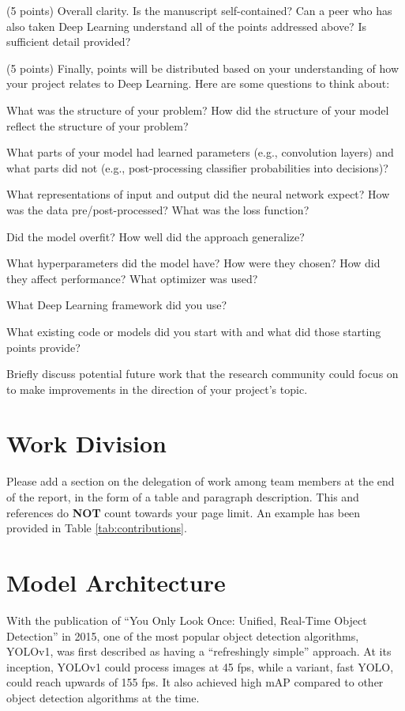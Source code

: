\documentclass[10pt,twocolumn,letterpaper]{article}
\begin{document}
(5 points) Overall clarity. Is the manuscript self-contained? Can a peer who has also taken Deep Learning understand all of the points addressed above? Is sufficient detail provided? 

(5 points) Finally, points will be distributed based on your understanding of how your project relates to Deep Learning. Here are some questions to think about: 

What was the structure of your problem? How did the structure of your model reflect the structure of your problem? 

What parts of your model had learned parameters (e.g., convolution layers) and what parts did not (e.g., post-processing classifier probabilities into decisions)? 

What representations of input and output did the neural network expect? How was the data pre/post-processed?
What was the loss function? 

Did the model overfit? How well did the approach generalize? 

What hyperparameters did the model have? How were they chosen? How did they affect performance? What optimizer was used? 

What Deep Learning framework did you use? 

What existing code or models did you start with and what did those starting points provide? 

Briefly discuss potential future work that the research community could focus on to make improvements in the direction of your project's topic.



\section{Work Division}

Please add a section on the delegation of work among team members at the end of the report, in the form of a table and paragraph description. This and references do \textbf{NOT} count towards your page limit. An example has been provided in Table \ref{tab:contributions}.

\newpage
\newpage

\section{Model Architecture}

With the publication of “You Only Look Once: Unified, Real-Time Object Detection” in 2015, one of the most popular object detection algorithms, YOLOv1, was first described as having a “refreshingly simple” approach. At its inception, YOLOv1 could process images at 45 fps, while a variant, fast YOLO, could reach upwards of 155 fps. It also achieved high mAP compared to other object detection algorithms at the time. 
\end{document}
